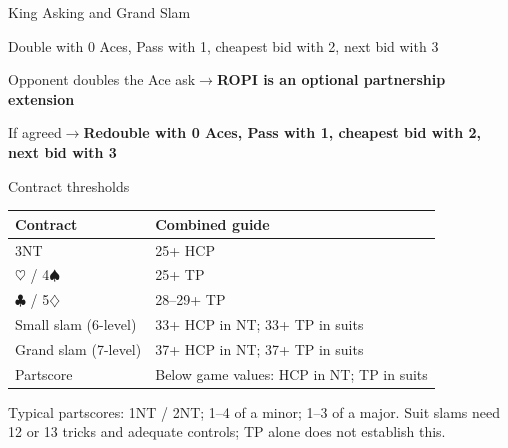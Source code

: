 \documentclass[10pt,letterpaper]{article}
\newcommand{\C}{\ensuremath{\clubsuit}}
\newcommand{\D}{\ensuremath{\diamondsuit}}
\newcommand{\Hh}{\ensuremath{\heartsuit}}
\renewcommand{\S}{\ensuremath{\spadesuit}}
\begin{document}
\begin{minipage}[t]{0.485\textwidth}
\begin{guidecard}{King Asking and Grand Slam}
\begin{branches}
\begin{branches}
\item Double with 0 Aces, Pass with 1, cheapest bid with 2, next bid with 3
\end{branches}
\item Opponent doubles the Ace ask\;\ensuremath{\longrightarrow}\;\textbf{ROPI is an optional partnership extension}
\begin{branches}
\item If agreed\;\ensuremath{\longrightarrow}\;\textbf{Redouble with 0 Aces, Pass with 1, cheapest bid with 2, next bid with 3}
\end{branches}
\end{branches}
\end{guidecard}

\begin{guidecard}{Contract thresholds}
\begin{tabularx}{\linewidth}{@{}>{\raggedright\arraybackslash}p{.43\linewidth}X@{}}\textbf{Contract}&\textbf{Combined guide}\\\hline
3NT & 25+ HCP\\[3pt]
4\Hh{} / 4\S{} & 25+ TP\\[3pt]
5\C{} / 5\D{} & 28--29+ TP\\[3pt]
Small slam (6-level) & 33+ HCP in NT; 33+ TP in suits\\[3pt]
Grand slam (7-level) & 37+ HCP in NT; 37+ TP in suits\\[3pt]
Partscore & Below game values: HCP in NT; TP in suits
\end{tabularx}\par\smallskip
Typical partscores: 1NT / 2NT; 1--4 of a minor; 1--3 of a major. Suit slams need 12 or 13 tricks and adequate controls; TP alone does not establish this.
\end{guidecard}

\end{minipage}
\end{document}
